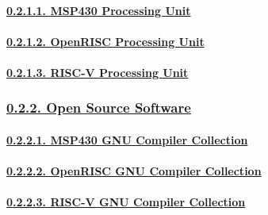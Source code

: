 \documentclass[
]{article}
\begin{document}
\hypertarget{msp430-processing-unit}{%
\paragraph{\texorpdfstring{\protect\hyperlink{msp430-processing-unit-1}{0.2.1.1.
MSP430 Processing
Unit}}{0.2.1.1. MSP430 Processing Unit}}\label{msp430-processing-unit}}

\hypertarget{openrisc-processing-unit}{%
\paragraph{\texorpdfstring{\protect\hyperlink{openrisc-processing-unit-1}{0.2.1.2.
OpenRISC Processing
Unit}}{0.2.1.2. OpenRISC Processing Unit}}\label{openrisc-processing-unit}}

\hypertarget{risc-v-processing-unit}{%
\paragraph{\texorpdfstring{\protect\hyperlink{risc-v-processing-unit-1}{0.2.1.3.
RISC-V Processing
Unit}}{0.2.1.3. RISC-V Processing Unit}}\label{risc-v-processing-unit}}

\hypertarget{open-source-software}{%
\subsubsection{\texorpdfstring{\protect\hyperlink{open-source-software-1}{0.2.2.
Open Source
Software}}{0.2.2. Open Source Software}}\label{open-source-software}}

\hypertarget{msp430-gnu-compiler-collection}{%
\paragraph{\texorpdfstring{\protect\hyperlink{msp430-gnu-compiler-collection-1}{0.2.2.1.
MSP430 GNU Compiler
Collection}}{0.2.2.1. MSP430 GNU Compiler Collection}}\label{msp430-gnu-compiler-collection}}

\hypertarget{openrisc-gnu-compiler-collection}{%
\paragraph{\texorpdfstring{\protect\hyperlink{openrisc-gnu-compiler-collection-1}{0.2.2.2.
OpenRISC GNU Compiler
Collection}}{0.2.2.2. OpenRISC GNU Compiler Collection}}\label{openrisc-gnu-compiler-collection}}

\hypertarget{risc-v-gnu-compiler-collection}{%
\paragraph{\texorpdfstring{\protect\hyperlink{risc-v-gnu-compiler-collection-1}{0.2.2.3.
RISC-V GNU Compiler
Collection}}{0.2.2.3. RISC-V GNU Compiler Collection}}\label{risc-v-gnu-compiler-collection}}
\end{document}
